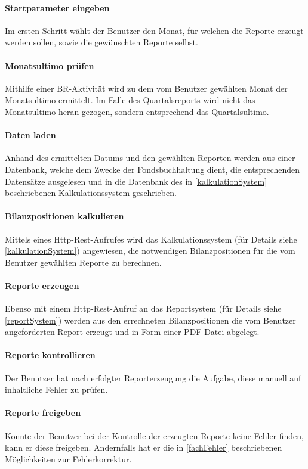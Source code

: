 \paragraph*{Startparameter eingeben}
Im ersten Schritt wählt der Benutzer den Monat, für welchen die Reporte erzeugt werden sollen, sowie die gewünschten Reporte selbst.

\paragraph*{Monatsultimo prüfen}
Mithilfe einer \ac{BR}-Aktivität wird zu dem vom Benutzer gewählten Monat der Monatsultimo ermittelt. Im Falle des Quartalsreports wird nicht das Monatsultimo heran gezogen, sondern entsprechend das Quartalsultimo.

\paragraph*{Daten laden}
Anhand des ermittelten Datums und den gewählten Reporten werden aus einer Datenbank, welche dem Zwecke der Fondsbuchhaltung dient, die entsprechenden Datensätze ausgelesen und in die Datenbank des in \ref{kalkulationSystem} beschriebenen Kalkulationssystem geschrieben.

\paragraph*{Bilanzpositionen kalkulieren}
Mittels eines Http-Rest-Aufrufes wird das Kalkulationssystem (für Details siehe \ref{kalkulationSystem}) angewiesen, die notwendigen Bilanzpositionen für die vom Benutzer gewählten Reporte zu berechnen.

\paragraph*{Reporte erzeugen}
Ebenso mit einem Http-Rest-Aufruf an das Reportsystem (für Details siehe \ref{reportSystem}) werden aus den errechneten Bilanzpositionen die vom Benutzer angeforderten Report erzeugt und in Form einer \ac{PDF}-Datei abgelegt.

\paragraph*{Reporte kontrollieren}
Der Benutzer hat nach erfolgter Reporterzeugung die Aufgabe, diese manuell auf inhaltliche Fehler zu prüfen.

\paragraph*{Reporte freigeben}
Konnte der Benutzer bei der Kontrolle der erzeugten Reporte keine Fehler finden, kann er diese freigeben. Andernfalls hat er die in \ref{fachFehler} beschriebenen Möglichkeiten zur Fehlerkorrektur.

